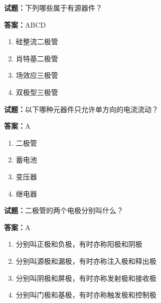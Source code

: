 \documentclass{ctexbook}
\begin{document}




\vspace{1em}

\textbf{试题：}下列哪些属于有源器件？ 

\textbf{答案：}ABCD 

\begin{enumerate}[leftmargin=3em]
  \item 硅整流二极管 

  \item 肖特基二极管 

  \item 场效应三极管 

  \item 双极型三极管 

\end{enumerate}





\vspace{1em}

\textbf{试题：}以下哪种元器件只允许单方向的电流流动？ 

\textbf{答案：}A 

\begin{enumerate}[leftmargin=3em]
  \item 二极管 

  \item 蓄电池 

  \item 变压器 

  \item 继电器 

\end{enumerate}





\vspace{1em}

\textbf{试题：}二极管的两个电极分别叫什么？ 

\textbf{答案：}A 

\begin{enumerate}[leftmargin=3em]
  \item 分别叫正极和负极，有时亦称阳极和阴极 

  \item 分别叫源极和漏极，有时亦称注入极和释出极 

  \item 分别叫阴极和屏极，有时亦称发射极和接收极 

  \item 分别叫门极和基极，有时亦称触发极和控制极 

\end{enumerate}
\end{document}
